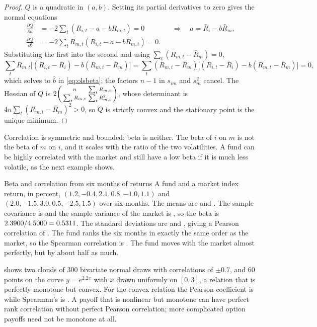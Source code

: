 \begin{chapterrefs}
\begin{proof}
$Q$ is a quadratic in $(a,b)$. Setting its partial derivatives to zero gives the normal equations
\begin{align*}
  \frac{\partial Q}{\partial a} &= -2\sum_t (R_{i,t}-a-bR_{m,t}) = 0
  &&\Longrightarrow\quad a = \bar R_i - b\bar R_m,\\
  \frac{\partial Q}{\partial b} &= -2\sum_t R_{m,t}(R_{i,t}-a-bR_{m,t}) = 0 .
\end{align*}
Substituting the first into the second and using $\sum_t (R_{m,t}-\bar R_m)=0$,
\begin{equation*}
  \sum_t R_{m,t}\bigl[(R_{i,t}-\bar R_i) - b(R_{m,t}-\bar R_m)\bigr]
  = \sum_t (R_{m,t}-\bar R_m)\bigl[(R_{i,t}-\bar R_i) - b(R_{m,t}-\bar R_m)\bigr] = 0,
\end{equation*}
which solves to $\hat b$ in \cref{eq:olsbeta}; the factors $n-1$ in $s_{im}$ and $s_m^2$ cancel. The Hessian
of $Q$ is $2\begin{psmallmatrix} n & \sum_t R_{m,t}\\ \sum_t R_{m,t} & \sum_t R_{m,t}^2\end{psmallmatrix}$, whose
determinant is $4n\sum_t (R_{m,t}-\bar R_m)^2>0$, so $Q$ is strictly convex and the stationary point is the
unique minimum.
\end{proof}

Correlation is symmetric and bounded; beta is neither. The beta of $i$ on $m$ is not the beta of $m$
on $i$, and it scales with the ratio of the two volatilities. A fund can be highly correlated with the market
and still have a low beta if it is much less volatile, as the next example shows.

\begin{example}{Beta and correlation from six months of returns}\label{ex:beta}
A fund and a market index return, in percent, $(1.2,-0.4,2.1,0.8,-1.0,1.1)$ and
$(2.0,-1.5,3.0,0.5,-2.5,1.5)$ over six months. The means are \exMeanF{} and \exMeanM. The sample
covariance is \exCov{} and the sample variance of the market is \exVarM, so the beta is
$2.3900/4.5000 = 0.5311$. The standard deviations are \exSdF{} and \exSdM, giving a Pearson correlation
of \exRho. The fund ranks the six months in exactly the same order as the market, so the Spearman
correlation is \exSpear. The fund moves with the market almost perfectly, but by about half as much.
\end{example}

 shows two clouds of 300 bivariate normal draws with correlations of $\pm 0.7$,
and 60 points on the curve $y=e^{2.2x}$ with $x$ drawn uniformly on $[0,3]$, a relation that is
perfectly monotone but convex. For the convex relation the Pearson coefficient is \convexPearson{}
while Spearman's is \convexSpearman. A payoff that is nonlinear but monotone can have perfect rank
correlation without perfect Pearson correlation; more complicated option payoffs need not be
monotone at all.


\end{chapterrefs}

